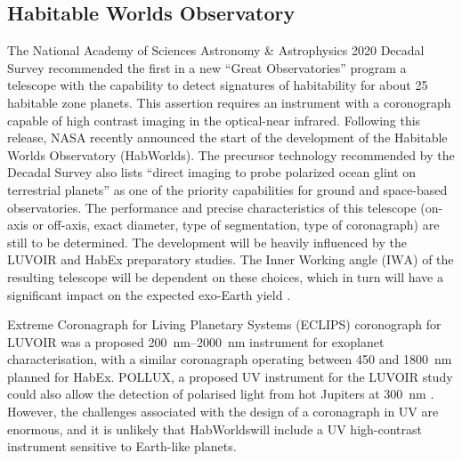 \documentclass[
    usenatbib,
]{mnras}
\newcommand{\IWA}{\ensuremath{\mathrm{IWA}}}
\newcommand{\hwo}{HabWorlds}
\begin{document}




\subsection{Habitable Worlds Observatory}
The National Academy of Sciences Astronomy \& Astrophysics 2020 Decadal Survey \citep{decadal} recommended the first in a new \enquote{Great Observatories} program a telescope with the capability to detect signatures of habitability for about 25 habitable zone planets.
%
This assertion requires an instrument with a coronograph capable of high contrast imaging in the optical-near infrared.
%
Following this release, NASA recently announced the start of the development of the Habitable Worlds Observatory (\hwo).
%
The precursor technology recommended by the Decadal Survey also lists ``direct imaging to probe polarized ocean glint on terrestrial planets'' as one of the priority capabilities \citep[Box E.1 in][]{decadal} for ground and space-based observatories.
%
The performance and precise characteristics of this telescope (on-axis or off-axis, exact diameter, type of segmentation, type of coronagraph) are still to be determined.
%
The development will be heavily influenced by the LUVOIR \citep{LUVOIR2019} and HabEx \citep{HabEx_2020} preparatory studies.
%
The Inner Working angle (\IWA) of the resulting telescope will be dependent on these choices, which in turn will have a significant impact on the expected exo-Earth yield \citep{Stark2019_exoplanetyield}.

Extreme Coronagraph for Living Planetary Systems (ECLIPS) coronograph for LUVOIR was a proposed \SIrange{200}{2000}{\nano\meter} instrument for exoplanet characterisation, with a similar coronagraph operating between \num{450} and \SI{1800}{\nano\meter} planned for HabEx.
%
POLLUX, a proposed UV instrument for the LUVOIR study could also allow the detection of polarised light from hot Jupiters at \SI{300}{\nano\meter} \citep{Bouret2018_pollux}.
%
However, the challenges associated with the design of a coronagraph in UV are enormous, and it is unlikely that \hwo will include a UV high-contrast instrument sensitive to Earth-like planets.
\end{document}
